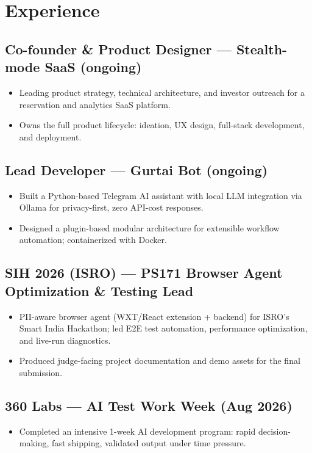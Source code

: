 \documentclass[10pt]{article}
\newif\ifinclrecent \inclrecenttrue
\begin{document}
\section{Experience}

\subsection{Co-founder \& Product Designer --- Stealth-mode SaaS \hfill (ongoing)}
\begin{itemize}
  \item Leading product strategy, technical architecture, and investor outreach for a reservation and analytics SaaS platform.
  \item Owns the full product lifecycle: ideation, UX design, full-stack development, and deployment.
\end{itemize}

\subsection{Lead Developer --- Gurtai Bot \hfill (ongoing)}
\begin{itemize}
  \item Built a Python-based Telegram AI assistant with local LLM integration via Ollama for privacy-first, zero API-cost responses.
  \item Designed a plugin-based modular architecture for extensible workflow automation; containerized with Docker.
\end{itemize}

\subsection{SIH 2026 (ISRO) --- PS171 Browser Agent \hfill Optimization \& Testing Lead}
\begin{itemize}
  \item PII-aware browser agent (WXT/React extension + backend) for ISRO's Smart India Hackathon; led E2E test automation, performance optimization, and live-run diagnostics.
  \item Produced judge-facing project documentation and demo assets for the final submission.
\end{itemize}

\ifinclrecent
\subsection{360 Labs --- AI Test Work Week \hfill (Aug 2026)}
\begin{itemize}
  \item Completed an intensive 1-week AI development program: rapid decision-making, fast shipping, validated output under time pressure.
\end{itemize}
\fi
\end{document}
